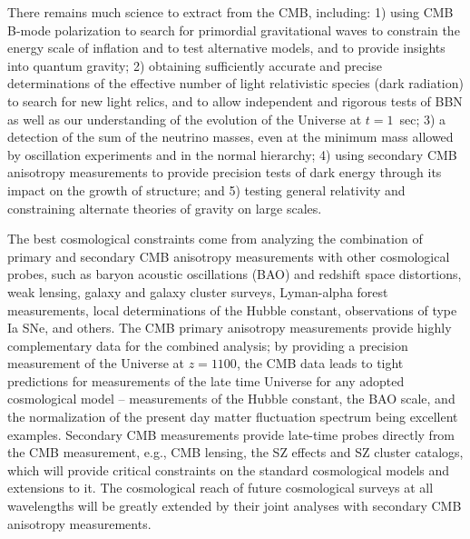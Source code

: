 There remains much science to extract from the CMB, including: 1) using CMB B-mode polarization to search for primordial gravitational waves to constrain the energy scale of inflation and to test alternative models, and to provide insights into quantum gravity; 2) obtaining sufficiently accurate and precise determinations of the effective number of light relativistic species (dark radiation) to search for new light relics, and to allow independent and rigorous tests of BBN as well as our understanding of the evolution of the Universe at $t = 1$\ sec; 3) a detection of the sum of the neutrino masses, even at the minimum mass allowed by oscillation experiments and in the normal hierarchy; 4) using secondary CMB anisotropy measurements to provide precision tests of dark energy through its impact on the growth of structure; and 5) testing general relativity and constraining alternate theories of gravity on large scales.

The best cosmological constraints come from analyzing the combination of primary and secondary CMB anisotropy measurements with other cosmological probes, such as baryon acoustic oscillations (BAO) and redshift space distortions, weak lensing, galaxy and galaxy cluster surveys, Lyman-alpha forest measurements, local determinations of the Hubble constant, observations of type Ia SNe, and others. The CMB primary anisotropy measurements provide highly complementary data for the combined analysis;  by providing a precision measurement of the Universe at $z = 1100$, the CMB data leads to tight predictions for measurements of the late time Universe for any adopted cosmological model  -- measurements of the Hubble constant, the BAO scale, and the normalization of the present day matter fluctuation spectrum being excellent examples. Secondary CMB measurements provide late-time probes directly from the CMB measurement, e.g., CMB lensing, the SZ effects and SZ cluster catalogs, which will provide critical constraints on the standard cosmological models and extensions to it. The cosmological reach of future cosmological surveys at all wavelengths will be greatly extended by their joint analyses with secondary CMB anisotropy measurements. 


